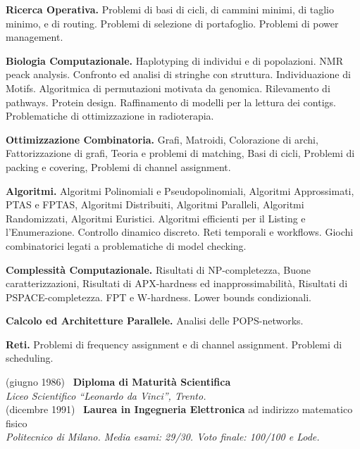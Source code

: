 
{\bf Ricerca Operativa.}
    Problemi di basi di cicli, di cammini minimi, di taglio minimo, e di routing.
    Problemi di selezione di portafoglio.
    Problemi di power management.

{\bf Biologia Computazionale.}
    Haplotyping di individui e di popolazioni.
    NMR peack analysis.
    Confronto ed analisi di stringhe con struttura.
    Individuazione di Motifs.
    Algoritmica di permutazioni motivata da genomica.
    Rilevamento di pathways.
    Protein design.
    Raffinamento di modelli per la lettura dei contigs.
    Problematiche di ottimizzazione in radioterapia. 

{\bf Ottimizzazione Combinatoria.}
    Grafi,
    Matroidi,
    Colorazione di archi,
    Fattorizzazione di grafi,
    Teoria e problemi di matching,
    Basi di cicli,
    Problemi di packing e covering,
    Problemi di channel assignment.

{\bf Algoritmi.}
    Algoritmi Polinomiali e Pseudopolinomiali,
    Algoritmi Approssimati,
    PTAS e FPTAS,
    Algoritmi Distribuiti,
    Algoritmi Paralleli,
    Algoritmi Randomizzati,
    Algoritmi Euristici.
    Algoritmi efficienti per il Listing e l'Enumerazione.
    Controllo dinamico discreto.
    Reti temporali e workflows.
    Giochi combinatorici legati a problematiche di model checking.

{\bf Complessit\`a Computazionale.}
    Risultati di NP-completezza,
    Buone caratterizzazioni,
    Risultati di APX-hardness ed inapprossimabilit\`a,
    Risultati di PSPACE-completezza.
    FPT e W-hardness.
    Lower bounds condizionali.

{\bf Calcolo ed Architetture Parallele.}
    Analisi delle POPS-networks.

{\bf Reti.}
    Problemi di frequency assignment e di channel assignment.
    Problemi di scheduling.\\




\vspace{-0.8mm}
\medskip \noindent
(giugno 1986) \
{\large \bf Diploma di Maturit\`a Scientifica}\\
{\em Liceo Scientifico ``Leonardo da Vinci'', Trento.}\\

\medskip \noindent
(dicembre 1991) \
{\large {\bf Laurea in Ingegneria Elettronica}  ad indirizzo matematico fisico}\\
{\em Politecnico di Milano. Media esami: 29/30. Voto finale: 100/100 e Lode.}

